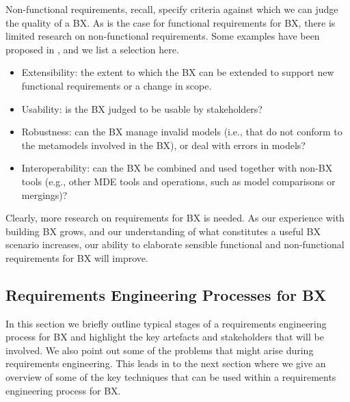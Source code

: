 Non-functional requirements, recall, specify criteria against which we can judge the quality of a BX. As is the case for functional requirements for BX, there is limited research on non-functional requirements. Some examples have been proposed in \cite{NalchigarSC13}, and we list a selection here.

\begin{itemize}
\item Extensibility: the extent to which the BX can be extended to support new functional requirements  or a change in scope.

\item Usability: is the BX judged to be usable by stakeholders?

\item Robustness: can the BX manage invalid models (i.e., that do not conform to the metamodels involved in the BX), or deal with errors in models?

\item Interoperability: can the BX be combined and used together with non-BX tools (e.g., other MDE tools and operations, such as model comparisons or mergings)?
\end{itemize}

Clearly, more research on requirements for BX is needed. As our experience with building BX grows, and our understanding of what constitutes a useful BX scenario increases, our ability to elaborate sensible functional and non-functional requirements for BX will improve.

\subsection{Requirements Engineering Processes for BX}
In this section we briefly outline typical stages of a requirements engineering process for BX and highlight the key artefacts and stakeholders that will be involved. We also point out some of the problems that might arise during requirements engineering. This leads in to the next section where we give an overview of some of the key techniques that can be used within a requirements engineering process for BX.

